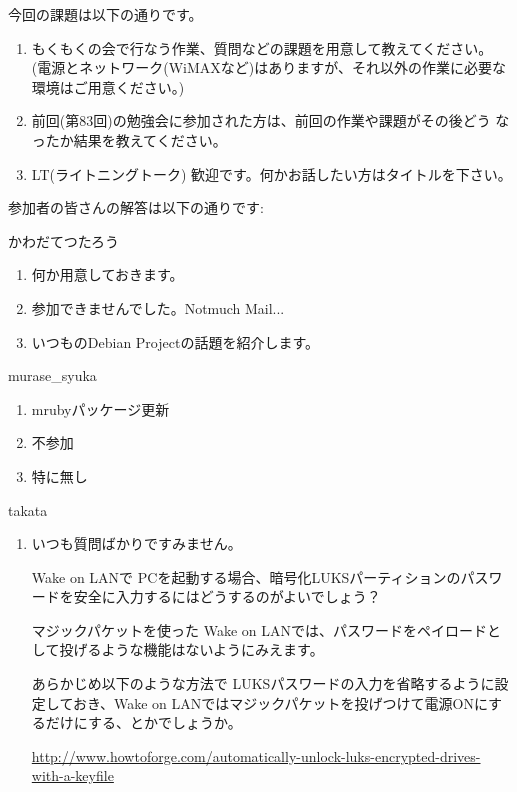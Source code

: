 \documentclass[mingoth,a4paper]{jsarticle}
\begin{document}
\begin{itemize}
\end{itemize}


今回の課題は以下の通りです。
\begin{screen}
  \begin{enumerate}

  \item %
    もくもくの会で行なう作業、質問などの課題を用意して教えてください。
    (電源とネットワーク(WiMAXなど)はありますが、それ以外の作業に必要な
    環境はご用意ください。)

  \item %
    前回(第83回)の勉強会に参加された方は、前回の作業や課題がその後どう
    なったか結果を教えてください。

  \item %
    LT(ライトニングトーク) 歓迎です。何かお話したい方はタイトルを下さい。
  \end{enumerate}
\end{screen}

参加者の皆さんの解答は以下の通りです:

\begin{prework}{ かわだてつたろう }
  \begin{enumerate}
  \item 何か用意しておきます。
  \item 参加できませんでした。Notmuch Mail...
  \item いつものDebian Projectの話題を紹介します。
  \end{enumerate}
\end{prework}

\begin{prework}{ murase\_{}syuka }
  \begin{enumerate}
  \item mrubyパッケージ更新
  \item 不参加
  \item 特に無し
  \end{enumerate}
\end{prework}

\begin{prework}{ takata }
  \begin{enumerate}
  \item いつも質問ばかりですみません。

    Wake on LANで PCを起動する場合、暗号化LUKSパーティションのパスワードを安全に入力するにはどうするのがよいでしょう？

    マジックパケットを使った Wake on LANでは、パスワードをペイロードとして投げるような機能はないようにみえます。

    あらかじめ以下のような方法で LUKSパスワードの入力を省略するように設定しておき、Wake on LANではマジックパケットを投げつけて電源ONにするだけにする、とかでしょうか。

    \url{http://www.howtoforge.com/automatically-unlock-luks-encrypted-drives-with-a-keyfile}
  \end{enumerate}
\end{prework}
\end{document}
